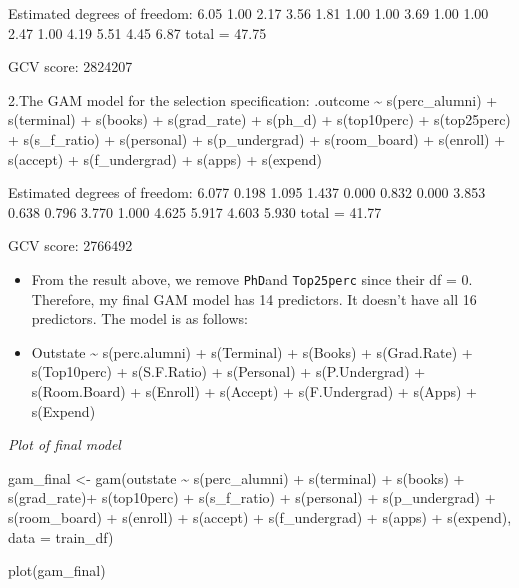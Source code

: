 \documentclass[
]{article}
\newenvironment{Shaded}{\begin{snugshade}}{\end{snugshade}}
\newcommand{\AttributeTok}[1]{\textcolor[rgb]{0.77,0.63,0.00}{#1}}
\newcommand{\FunctionTok}[1]{\textcolor[rgb]{0.00,0.00,0.00}{#1}}
\newcommand{\NormalTok}[1]{#1}
\newcommand{\OtherTok}[1]{\textcolor[rgb]{0.56,0.35,0.01}{#1}}
\newcommand{\SpecialCharTok}[1]{\textcolor[rgb]{0.00,0.00,0.00}{#1}}
\begin{document}
Estimated degrees of freedom: 6.05 1.00 2.17 3.56 1.81 1.00 1.00 3.69
1.00 1.00 2.47 1.00 4.19 5.51 4.45 6.87 total = 47.75

GCV score: 2824207

2.The GAM model for the selection specification: .outcome
\textasciitilde{} s(perc\_alumni) + s(terminal) + s(books) +
s(grad\_rate) + s(ph\_d) + s(top10perc) + s(top25perc) + s(s\_f\_ratio)
+ s(personal) + s(p\_undergrad) + s(room\_board) + s(enroll) + s(accept)
+ s(f\_undergrad) + s(apps) + s(expend)

Estimated degrees of freedom: 6.077 0.198 1.095 1.437 0.000 0.832 0.000
3.853 0.638 0.796 3.770 1.000 4.625 5.917 4.603 5.930 total = 41.77

GCV score: 2766492

\begin{itemize}
\item
  From the result above, we remove \texttt{PhD}and \texttt{Top25perc}
  since their df = 0. Therefore, my final GAM model has 14 predictors.
  It doesn't have all 16 predictors. The model is as follows:
\item
  Outstate \textasciitilde{} s(perc.alumni) + s(Terminal) + s(Books) +
  s(Grad.Rate) + s(Top10perc) + s(S.F.Ratio) + s(Personal) +
  s(P.Undergrad) + s(Room.Board) + s(Enroll) + s(Accept) +
  s(F.Undergrad) + s(Apps) + s(Expend)
\end{itemize}

\emph{Plot of final model}

\begin{Shaded}
\begin{Highlighting}[]
\NormalTok{gam\_final }\OtherTok{\textless{}{-}} \FunctionTok{gam}\NormalTok{(outstate }\SpecialCharTok{\textasciitilde{}} \FunctionTok{s}\NormalTok{(perc\_alumni) }\SpecialCharTok{+} \FunctionTok{s}\NormalTok{(terminal) }\SpecialCharTok{+} \FunctionTok{s}\NormalTok{(books) }\SpecialCharTok{+} 
                \FunctionTok{s}\NormalTok{(grad\_rate)}\SpecialCharTok{+} \FunctionTok{s}\NormalTok{(top10perc) }\SpecialCharTok{+} \FunctionTok{s}\NormalTok{(s\_f\_ratio) }\SpecialCharTok{+} \FunctionTok{s}\NormalTok{(personal) }\SpecialCharTok{+} 
                \FunctionTok{s}\NormalTok{(p\_undergrad) }\SpecialCharTok{+} \FunctionTok{s}\NormalTok{(room\_board) }\SpecialCharTok{+} \FunctionTok{s}\NormalTok{(enroll) }\SpecialCharTok{+} \FunctionTok{s}\NormalTok{(accept) }\SpecialCharTok{+}
                \FunctionTok{s}\NormalTok{(f\_undergrad) }\SpecialCharTok{+} \FunctionTok{s}\NormalTok{(apps) }\SpecialCharTok{+} \FunctionTok{s}\NormalTok{(expend), }
              \AttributeTok{data =}\NormalTok{ train\_df) }

\FunctionTok{plot}\NormalTok{(gam\_final)}
\end{Highlighting}
\end{Shaded}
\end{document}
